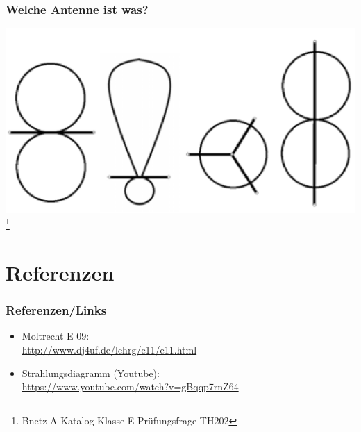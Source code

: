 \begin{frame}
    \frametitle{Welche Antenne ist was?}
    \begin{center}
        \includegraphics[width=1\textwidth]{e11/Abstrahl.png}
        \footnote{\tiny Bnetz-A Katalog Klasse E Prüfungsfrage TH202 }
	\end{center}
\end{frame}


\section*{Referenzen}

\begin{frame}
    \frametitle{Referenzen/Links}
    
    \footnotesize
    \begin{itemize}
        \item Moltrecht E 09: \\
              \url{http://www.dj4uf.de/lehrg/e11/e11.html}
        \item Strahlungsdiagramm (Youtube): \\
              \url{https://www.youtube.com/watch?v=gBqqp7rnZ64}
    \end{itemize}

\end{frame}



